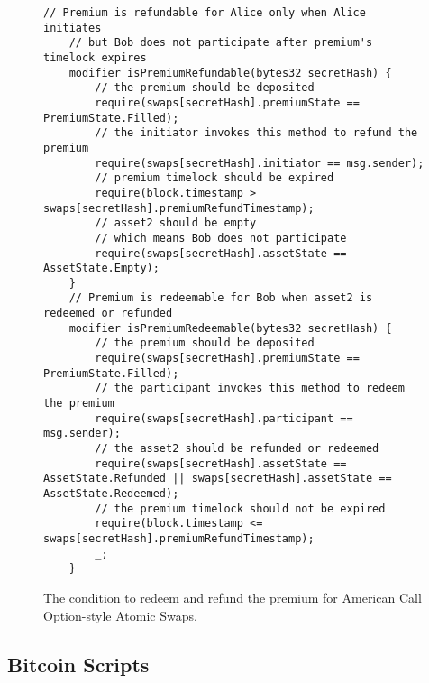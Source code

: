 \begin{figure}
    \begin{lstlisting}[language=Solidity, basicstyle=\tiny]
    // Premium is refundable for Alice only when Alice initiates
    // but Bob does not participate after premium's timelock expires
    modifier isPremiumRefundable(bytes32 secretHash) {
        // the premium should be deposited
        require(swaps[secretHash].premiumState == PremiumState.Filled);
        // the initiator invokes this method to refund the premium
        require(swaps[secretHash].initiator == msg.sender);
        // premium timelock should be expired
        require(block.timestamp > swaps[secretHash].premiumRefundTimestamp);
        // asset2 should be empty
        // which means Bob does not participate
        require(swaps[secretHash].assetState == AssetState.Empty);
    }
    // Premium is redeemable for Bob when asset2 is redeemed or refunded
    modifier isPremiumRedeemable(bytes32 secretHash) {
        // the premium should be deposited
        require(swaps[secretHash].premiumState == PremiumState.Filled);
        // the participant invokes this method to redeem the premium
        require(swaps[secretHash].participant == msg.sender);
        // the asset2 should be refunded or redeemed
        require(swaps[secretHash].assetState == AssetState.Refunded || swaps[secretHash].assetState == AssetState.Redeemed);
        // the premium timelock should not be expired
        require(block.timestamp <= swaps[secretHash].premiumRefundTimestamp);
        _;
    }
    \end{lstlisting}
    \label{code:premium_condition_options}
    \caption{The condition to redeem and refund the premium for American Call Option-style Atomic Swaps.}
\end{figure}

\subsection{Bitcoin Scripts}

